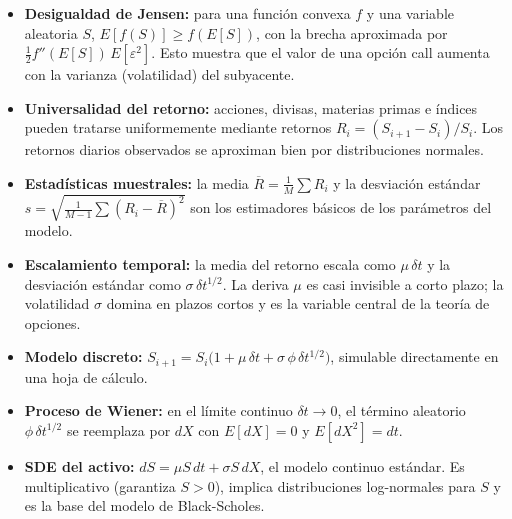 \documentclass[12pt]{article}
\begin{document}
\begin{itemize}

  \item \textbf{Desigualdad de Jensen:} para una funci\'on convexa $f$ y una variable
        aleatoria $S$, $E[f(S)] \geq f(E[S])$, con la brecha aproximada por
        $\frac{1}{2}f''(E[S])\,E[\varepsilon^2]$.
        Esto muestra que el valor de una opci\'on call aumenta con la varianza
        (volatilidad) del subyacente.

  \item \textbf{Universalidad del retorno:} acciones, divisas, materias primas e
        \'indices pueden tratarse uniformemente mediante retornos
        $R_i = (S_{i+1}-S_i)/S_i$. Los retornos diarios observados se aproximan
        bien por distribuciones normales.

  \item \textbf{Estadísticas muestrales:} la media $\overline{R} = \frac{1}{M}\sum R_i$
        y la desviaci\'on est\'andar $s = \sqrt{\frac{1}{M-1}\sum(R_i-\overline{R})^2}$
        son los estimadores b\'asicos de los par\'ametros del modelo.

  \item \textbf{Escalamiento temporal:} la media del retorno escala como $\mu\,\delta t$
        y la desviaci\'on est\'andar como $\sigma\,\delta t^{1/2}$.
        La deriva $\mu$ es casi invisible a corto plazo; la volatilidad $\sigma$
        domina en plazos cortos y es la variable central de la teor\'ia de opciones.

  \item \textbf{Modelo discreto:}
        $S_{i+1} = S_i\bigl(1 + \mu\,\delta t + \sigma\,\phi\,\delta t^{1/2}\bigr)$,
        simulable directamente en una hoja de c\'alculo.

  \item \textbf{Proceso de Wiener:} en el l\'imite continuo $\delta t \to 0$,
        el t\'ermino aleatorio $\phi\,\delta t^{1/2}$ se reemplaza por $dX$ con
        $E[dX]=0$ y $E[dX^2]=dt$.

  \item \textbf{SDE del activo:}
        $dS = \mu S\,dt + \sigma S\,dX$,
        el modelo continuo est\'andar. Es multiplicativo (garantiza $S > 0$),
        implica distribuciones log-normales para $S$ y es la base del modelo
        de Black-Scholes.

\end{itemize}
\end{document}
